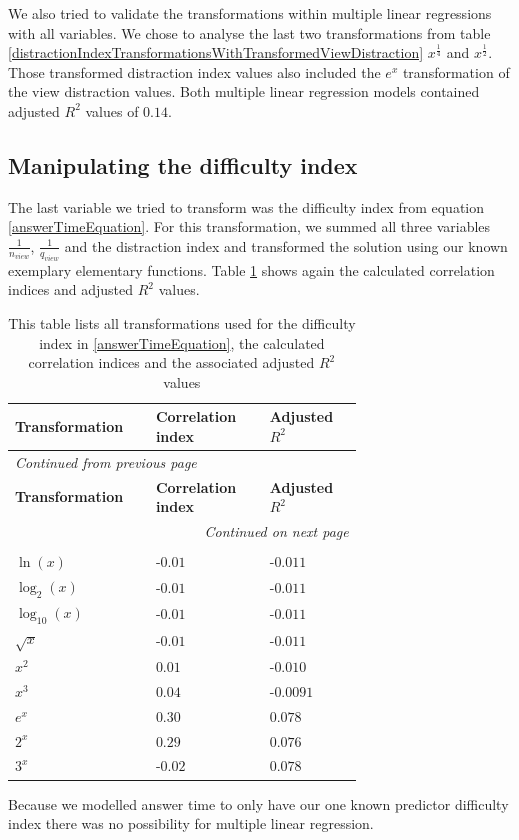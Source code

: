 We also tried to validate the transformations within multiple linear regressions with all variables. We chose to analyse the last two transformations
from table \ref{distractionIndexTransformationsWithTransformedViewDistraction} $x^{\frac{1}{4}}$ and $x^{\frac{1}{2}}$. Those transformed distraction index values
also included the $e^x$ transformation of the view distraction values. Both multiple linear regression models contained adjusted $R^2$ values of $0.14$.
\subsection{Manipulating the difficulty index}
The last variable we tried to transform was the difficulty index from equation \ref{answerTimeEquation}. For this transformation, we summed all three variables
$\frac{1}{n_{view}}$, $\frac{1}{q_{view}}$ and the distraction index and transformed the solution using our known exemplary elementary functions. Table
\ref{difficultyIndexTransformations} shows again the calculated correlation indices and adjusted $R^2$ values.
\begin{longtable}{| p{0.24\linewidth} | p{0.25\linewidth} | p{0.20\linewidth}|}
    \hline
    \textbf{Transformation} & \textbf{Correlation index} & \textbf{Adjusted $R^2$} \\
    \hline
    \endfirsthead
    \multicolumn{3}{l}{{\textit{Continued from previous page}}} \\
    \hline
    \textbf{Transformation} & \textbf{Correlation index} & \textbf{Adjusted $R^2$} \\
    \hline
    \endhead
    \hline \multicolumn{3}{r}{{\textit{Continued on next page}}} \\
    \endfoot
    \hline
    \caption{This table lists all transformations used for the difficulty index in \ref{answerTimeEquation}, the calculated correlation indices and the associated adjusted $R^2$ values \label{difficultyIndexTransformations}}\\
    \endlastfoot
    $ \ln(x) $ & -$0.01$ & -$0.011$ \\
    \hline
    $ \log_{2}(x) $ & -$0.01$ & -$0.011$ \\
    \hline
    $ \log_{10}(x) $ & -$0.01$ & -$0.011$ \\
    \hline
    $ \sqrt{x} $ & -$0.01$ & -$0.011$ \\
    \hline
    $ x^2 $ & $0.01$ & -$0.010$ \\
    \hline
    $ x^3 $ & $0.04$ & -$0.0091$ \\
    \hline
    $ e^x $ & $0.30$ & $0.078$ \\
    \hline
    $ 2^x $ & $0.29$ & $0.076$ \\
    \hline
    $ 3^x $ & -$0.02$ & $0.078$ \\
\end{longtable}
Because we modelled answer time to only have our one known predictor difficulty index there was no possibility for multiple linear
regression.
